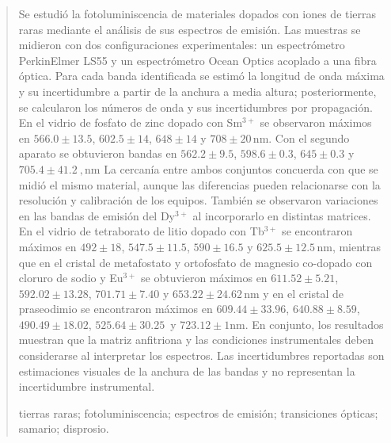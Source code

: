 \documentclass[journal]{IEEEtran}
\begin{document}
\begin{abstract}
Se estudió la fotoluminiscencia de materiales dopados con iones de tierras
raras mediante el análisis de sus espectros de emisión. Las muestras se midieron con dos configuraciones
experimentales: un espectrómetro PerkinElmer LS55 y un espectrómetro
Ocean Optics acoplado a una fibra óptica. Para cada banda identificada
se estimó la longitud de onda máxima y su incertidumbre a partir de la
anchura a media altura; posteriormente, se calcularon los números de onda
y sus incertidumbres por propagación. En el vidrio de fosfato de zinc
dopado con Sm$^{3+}$ se observaron máximos en
$566.0 \pm 13.5$, $602.5 \pm 14$,
$648 \pm 14$ y $708\pm 20\,\text{nm}$.
Con el segundo aparato se obtuvieron bandas en
$562.2\pm 9.5$, $598.6\pm 0.3$, $645\pm 0.3$ y $705.4\pm 41.2\ ,\text{nm}$
La cercanía entre ambos conjuntos concuerda con que se midió el mismo
material, aunque las diferencias pueden relacionarse con la resolución
y calibración de los equipos. También se observaron variaciones en las
bandas de emisión del Dy$^{3+}$ al incorporarlo en distintas matrices.
En el vidrio de tetraborato de litio dopado con Tb$^{3+}$ se encontraron máximos en $492 \pm 18$, $547.5 \pm 11.5$,
$590 \pm 16.5$ y $625.5 \pm 12.5\,\text{nm}$, mientras que en el cristal de metafostato y ortofosfato de magnesio co-dopado con cloruro de sodio y Eu$^{3+}$ se obtuvieron máximos en $611.52 \pm 5.21$, $592.02 \pm 13.28$,
$701.71 \pm 7.40$ y $653.22\pm 24.62\,\text{nm}$ y en el cristal de praseodimio se encontraron máximos en $609.44 \pm 33.96$, $640.88 \pm 8.59$,
$490.49 \pm 18.02$, $525.64\pm 30.25\,$ y $723.12 \pm 1 \text{nm}$.
En conjunto, los resultados muestran que la matriz anfitriona y las
condiciones instrumentales deben considerarse al interpretar los
espectros. Las incertidumbres reportadas son estimaciones visuales de
la anchura de las bandas y no representan la incertidumbre instrumental.
\vspace{2mm}

\begin{IEEEkeywords}
tierras raras; fotoluminiscencia;
espectros de emisión; transiciones ópticas; samario; disprosio.
\end{IEEEkeywords}
\end{abstract}
\bigskip
\end{document}
